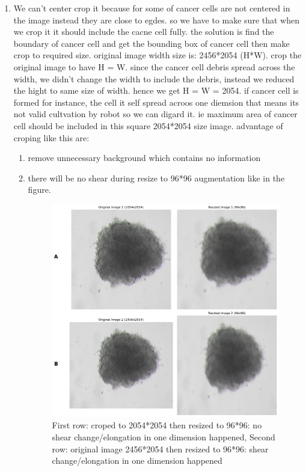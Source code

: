 \begin{enumerate}
  \item  We can't center crop it because for some of cancer cells are not centered in the image instead they are close to egdes. so we have to make 
  sure that when we crop it it should include the cacne cell fully. the solution is find the boundary of cancer cell and get the bounding box of cancer 
  cell then make crop to required size. original image width size is: 2456*2054 (H*W). crop the original image to have H = W. since the cancer cell debris
   spread across the width, we didn't change the width to include the debris,
   instead we reduced the hight to same size of width. hence we get H = W = 2054. if cancer cell is formed for instance, the cell it self spread acroos
    one diemsion that means its not valid cultvation by robot so we can digard it. ie maximum area of cancer cell should be included in this square 
    2054*2054 size image. advantage of croping like this are:
    \begin{enumerate}
      \item  remove unnecessary background which contains no information
      \item  there will be no shear during resize to 96*96 augmentation like in the figure.
      \begin{figure}[H]
        \centering
        \includegraphics[scale=0.46]{figures/long.png} 
        \caption{First row: croped to 2054*2054 then resized to 96*96: no shear change/elongation in one dimension happened, Second row: 
       original image 2456*2054 then resized to 96*96: shear change/elongation in one dimension happened}
        \label{fig:elong}
      \end{figure}
      

\end{enumerate}
\end{enumerate}

